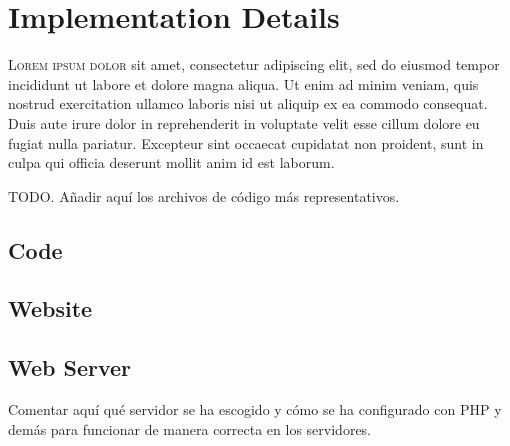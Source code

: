 

\chapter{Implementation Details}\label{cha:code}



\lettrine{L}{orem ipsum dolor} sit amet, consectetur adipiscing elit, sed do
eiusmod tempor incididunt ut labore et dolore magna aliqua. Ut enim ad minim
veniam, quis nostrud exercitation ullamco laboris nisi ut aliquip ex ea commodo
consequat. Duis aute irure dolor in reprehenderit in voluptate velit esse
cillum dolore eu fugiat nulla pariatur. Excepteur sint occaecat cupidatat non
proident, sunt in culpa qui officia deserunt mollit anim id est laborum.


TODO. Añadir aquí los archivos de código más representativos.




\section{Code}





\section{Website}



\section{Web Server}
Comentar aquí qué servidor se ha escogido y cómo se ha configurado con PHP y
demás para funcionar de manera correcta en los servidores.

